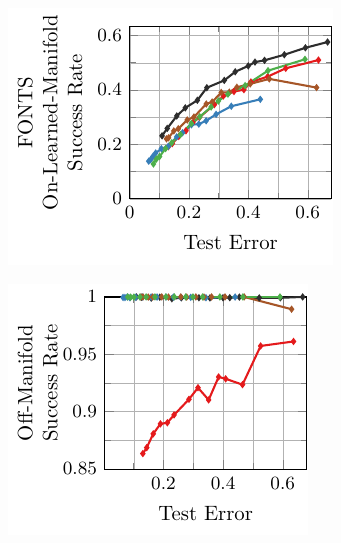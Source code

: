 \begin{appendix}
\begin{figure}[t]
    \centering
    \vskip -0.4cm
    \begin{subfigure}{0.245\textwidth}
        \centering
        \includegraphics[width=\textwidth]{appendix_mlp_fonts_error_on_learned.pdf}
    \end{subfigure}
    \begin{subfigure}{0.225\textwidth}
        \centering
        \includegraphics[width=\textwidth]{appendix_mlp_fonts_error_off.pdf}
    \end{subfigure}
    \\

\end{figure}
\end{appendix}
